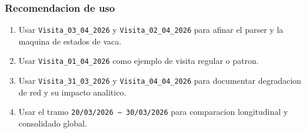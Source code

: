 \subsubsection{Recomendacion de uso}

\begin{enumerate}
\item Usar \texttt{Visita\_03\_04\_2026} y \texttt{Visita\_02\_04\_2026} para afinar el parser y la maquina de estados de vaca.
\item Usar \texttt{Visita\_01\_04\_2026} como ejemplo de visita regular o patron.
\item Usar \texttt{Visita\_31\_03\_2026} y \texttt{Visita\_04\_04\_2026} para documentar degradacion de red y su impacto analitico.
\item Usar el tramo \texttt{20/03/2026 -- 30/03/2026} para comparacion longitudinal y consolidado global.
\end{enumerate}
